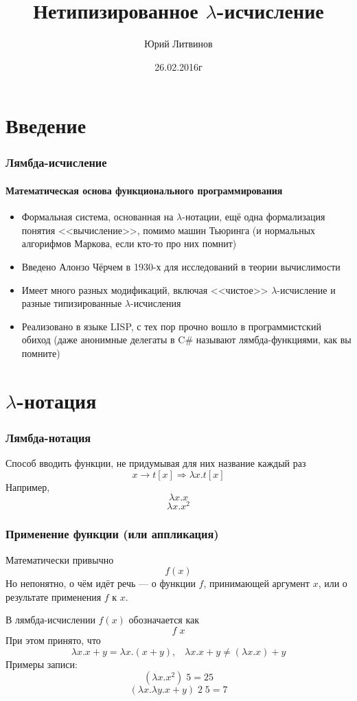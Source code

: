 \documentclass[xetex,mathserif,serif]{beamer}
\title{Нетипизированное $\lambda$-исчисление}
\author{Юрий Литвинов}
\date{26.02.2016г}
\begin{document}
	
	\frame{\titlepage}

	\section{Введение}
	
	\begin{frame}
		\frametitle{Лямбда-исчисление}
		\framesubtitle{Математическая основа функционального программирования}
		\begin{itemize}
			\item Формальная система, основанная на $\lambda$-нотации, ещё одна формализация
					понятия <<вычисление>>, помимо машин Тьюринга (и нормальных алгорифмов
					Маркова, если кто-то про них помнит)
			\item Введено Алонзо Чёрчем в 1930-х для исследований в теории вычислимости
			\item Имеет много разных модификаций, включая <<чистое>> $\lambda$-исчисление и
					разные типизированные $\lambda$-исчисления
			\item Реализовано в языке LISP, с тех пор прочно вошло в программистский обиход
					(даже анонимные делегаты в C\# называют лямбда-функциями, как вы помните)
		\end{itemize}
	\end{frame}
		
	\section{$\lambda$-нотация}
		
	\begin{frame}
		\frametitle{Лямбда-нотация}
		Способ вводить функции, не придумывая для них название каждый раз
		$$x \rightarrow t[x] \Longrightarrow \lambda x.t[x]$$
		Например,
		$$\lambda x.x$$
		$$\lambda x.x^2$$
	\end{frame}

	\begin{frame}
		\frametitle{Применение функции (или аппликация)}
		Математически привычно
		$$f(x)$$
		Но непонятно, о чём идёт речь --- о функции $f$, принимающей аргумент $x$, или о результате применения
		$f$ к $x$. 

		В лямбда-исчислении $f(x)$ обозначается как
		$$f \; x$$
		При этом принято, что
		$$\lambda x. x + y = \lambda x.(x + y), \;\;\; 
		\lambda x. x + y \neq (\lambda x.x) + y$$
		Примеры записи:
		$$(\lambda x.x^2) \; 5 = 25$$
		$$(\lambda x.\lambda y.x + y) \; 2 \; 5 = 7$$
	\end{frame}
\end{document}
